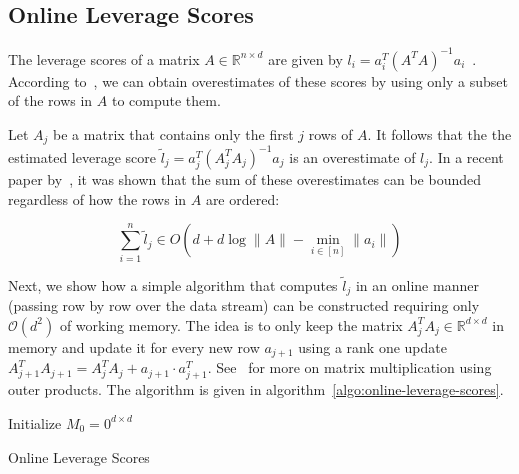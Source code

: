 \subsection{Online Leverage Scores}

The leverage scores of a matrix $A \in \mathbb{R}^{n \times d}$
are given by $l_i = a_i^T (A^TA)^{-1}a_i$~\cite{online-row-sampling}.
According to~\cite{online-row-sampling}, we can obtain overestimates
of these scores by using only a subset of the rows in $A$ to compute them.

Let $A_j$ be a matrix that contains only the first $j$ rows of $A$.
It follows that the the estimated leverage score
$\tilde{l}_j = a_j^T (A_j^TA_j)^{-1}a_j$ is an overestimate of $l_j$.
In a recent paper by~\cite{tensor-factorization}, it was shown that
the sum of these overestimates can be bounded regardless of how
the rows in $A$ are ordered:
\begin{lemma}
    \begin{equation*}
        \sum_{i=1}^n \tilde{l}_j \in O(d + d \log \lVert A \rVert - \min_{i \in [n]} \lVert a_i \rVert)
    \end{equation*}
\end{lemma}

Next, we show how a simple algorithm that computes $\tilde{l}_j$ in an
online manner (passing row by row over the data stream)
can be constructed requiring only $\mathcal{O}(d^2)$ of working memory.
The idea is to only keep the matrix $A_j^TA_j \in \mathbb{R}^{d \times d}$
in memory and update it
for every new row $a_{j+1}$ using a rank one update
$A_{j+1}^TA_{j+1} = A_j^TA_j + a_{j+1} \cdot a_{j+1}^T$.
See~\cite{matrix-computations} for more on matrix multiplication using
outer products. The algorithm is given in algorithm~\ref{algo:online-leverage-scores}.

\begin{algorithm}
    \DontPrintSemicolon
    Initialize $M_0 = 0^{d \times d}$ \;
    \caption{Online Leverage Scores\label{algo:online-leverage-scores}}
\end{algorithm}